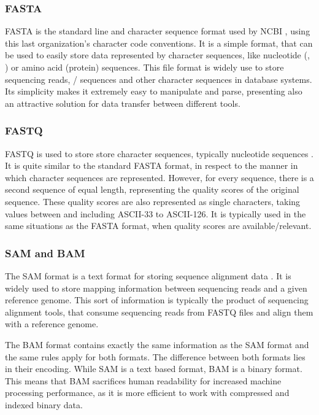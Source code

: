 \subsubsection*{FASTA}

FASTA is the standard line and character sequence format used by NCBI
\cite{ncbi:fasta}, using this last organization's character code conventions. It
is a simple format, that can be used to easily store data represented by
character sequences, like nucleotide (\dna, \rna) or amino acid (protein)
sequences. This file format is widely use to store sequencing reads, \dna/\rna{}
sequences and other character sequences in database systems. Its simplicity
makes it extremely easy to manipulate and parse, presenting also an attractive
solution for data transfer between different tools.

\subsubsection*{FASTQ}

FASTQ is used to store store character sequences, typically nucleotide sequences
\cite{Cock2010}. It is quite similar to the standard FASTA format, in respect to
the manner in which character sequences are represented. However, for every
sequence, there is a second sequence of equal length, representing the quality
scores of the original sequence. These quality scores are also represented as
single characters, taking values between and including ASCII-33 to ASCII-126.
It is typically used in the same situations as the FASTA format, when quality
scores are available/relevant.

\subsubsection*{SAM and BAM}

The SAM format is a text format for storing sequence alignment data
\cite{genome:sam}. It is widely used to store mapping information between
sequencing reads and a given reference genome. This sort of information is
typically the product of sequencing alignment tools, that consume sequencing
reads from FASTQ files and align them with a reference genome.

The BAM format contains exactly the same information as the SAM format and the
same rules apply for both formats. The difference between both formats lies in
their encoding. While SAM is a text based format, BAM is a binary format. This
means that BAM sacrifices human readability for increased machine processing
performance, as it is more efficient to work with compressed and indexed binary
data.

